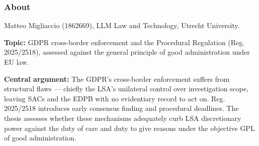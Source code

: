 %
%

\subsubsection{About}

Matteo Migliaccio (1862669), LLM Law and Technology, Utrecht University.

\textbf{Topic:} GDPR cross-border enforcement and the Procedural Regulation
(Reg. 2025/2518), assessed against the general principle of good administration
under EU law.

\textbf{Central argument:} The GDPR's cross-border enforcement suffers from
structural flaws --- chiefly the LSA's unilateral control over investigation
scope, leaving SACs and the EDPB with no evidentiary record to act on.
Reg. 2025/2518 introduces early consensus finding and procedural deadlines. The
thesis assesses whether these mechanisms adequately curb LSA discretionary power
against the duty of care and duty to give reasons under the objective GPL of good
administration.

